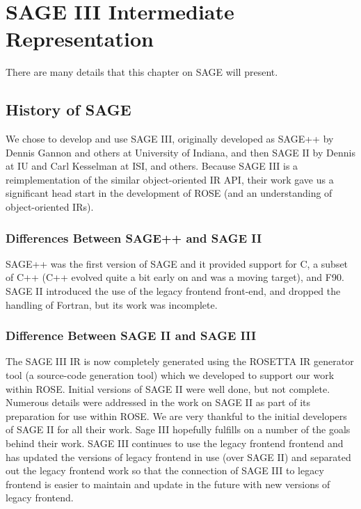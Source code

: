 \chapter{SAGE III Intermediate Representation}
\label{SageIII}

There are many details that this chapter on SAGE will present.



\section{History of SAGE}
    We chose to develop and use SAGE III, originally 
developed as SAGE++ by Dennis Gannon and others at University 
of Indiana, and then SAGE II by Dennis at IU and Carl Kesselman at ISI,
and others.  Because SAGE III is a reimplementation of the similar
object-oriented IR API, their work gave us a significant head 
start in the development of ROSE (and an understanding of 
object-oriented IRs).

\subsection{Differences Between SAGE++ and SAGE II}
     SAGE++ was the first version of SAGE and it provided
support for C, a subset of C++ (C++ evolved quite a bit early on
and was a moving target), and F90. SAGE II introduced the use
of the legacy frontend front-end, and dropped the handling of Fortran, 
but its work was incomplete.

\subsection{Difference Between SAGE II and SAGE III}
   The SAGE III IR is now completely generated using the ROSETTA
IR generator tool (a source-code generation tool) which we
developed to support our work within ROSE.  Initial versions 
of SAGE II were well done, but not complete.  Numerous 
details were addressed in the work on SAGE II as part of its 
preparation for use within ROSE.  We are very thankful to the 
initial developers of SAGE II for all their work.  Sage III
hopefully fulfills on a number of the goals behind their work.
SAGE III continues to use the legacy frontend frontend and has updated
the versions of legacy frontend in use (over SAGE II) and separated
out the legacy frontend work so that the connection of SAGE III to legacy frontend
is easier to maintain and update in the future with new versions 
of legacy frontend.

